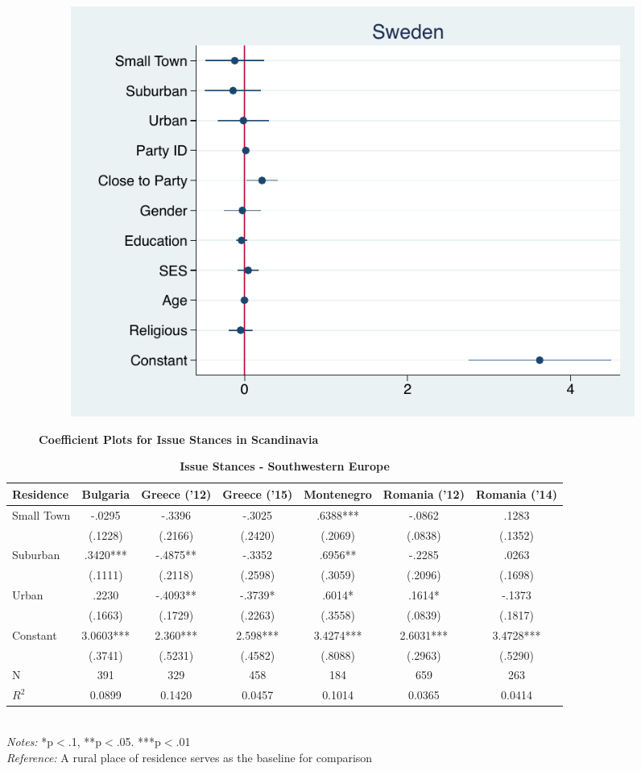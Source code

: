 \documentclass[12pt, titlepage]{article}
\newcommand\e{\emph}
\newcommand\tb{\textbf}
\begin{document}
\begin{figure}[H]
\begin{subfigure}[b]{0.475\textwidth}
		\includegraphics[width=\textwidth]{LibCoef/Sweden}
	\end{subfigure}
	\caption[ \tb{Issue Stances - Scandinavia} ]
	{\tb {Coefficient Plots for Issue Stances in Scandinavia} }
	\label{ScandinaviaLib}
\end{figure}

\begin{landscape}
	\begin{table}
		\centering
		\def\arraystretch{1.5}
		\caption{\tb{Issue Stances - Southwestern Europe}}
		\begin{tabulary}{\linewidth}{l c c c c c c}
			\hline
			\tb{Residence}& \tb{Bulgaria}& \tb{Greece ('12)}& \tb{Greece ('15)} & \tb{Montenegro} & \tb{Romania ('12)} & \tb {Romania ('14)}\\
			\hline
			Small Town& -.0295&-.3396 &-.3025 &.6388*** & -.0862 &.1283  \\
			&(.1228) &(.2166)  &(.2420)  & (.2069) & (.0838)  & (.1352)  \\
			Suburban& .3420***&-.4875** &-.3352  & .6956** & -.2285  & .0263 \\
			&(.1111)& (.2118)  &(.2598)  &(.3059)  & (.2096) & (.1698) \\
			Urban&.2230& -.4093** & -.3739*  & .6014* & .1614* &-.1373  \\
			&(.1663)& (.1729) &(.2263)   & (.3558)  & (.0839) & (.1817)  \\
			Constant&3.0603***&2.360***  & 2.598*** & 3.4274*** &2.6031***  & 3.4728***  \\
			&(.3741)& (.5231)  &(.4582)  &(.8088)  & (.2963) & (.5290)  \\
			N&391 & 329  &458   & 184 & 659  &263  \\
			$R^2$&0.0899& 0.1420  &0.0457  & 0.1014 & 0.0365 & 0.0414 \\
			\hline
\end{tabulary}
\\
\e{Notes:} *p$<$.1, **p$<$.05. ***p$<$.01 \\
\e{Reference:} A rural place of residence serves as the baseline for comparison
\label{SWELib}
\end{table}
\end{landscape}
\end{document}
